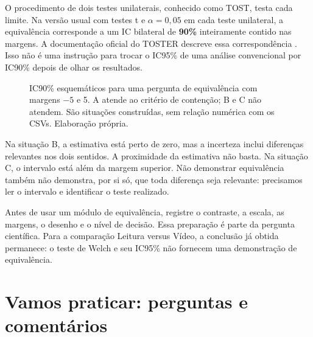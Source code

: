 O procedimento de dois testes unilaterais, conhecido como TOST, testa cada limite. Na versão usual com testes t e $\alpha=0{,}05$ em cada teste unilateral, a equivalência corresponde a um IC bilateral de \textbf{90\%} inteiramente contido nas margens. A documentação oficial do TOSTER descreve essa correspondência \parencite{TOSTERHipoteses}. Isso não é uma instrução para trocar o IC95\% de uma análise convencional por IC90\% depois de olhar os resultados.

\begin{figure}[H]
\centering
{}
\caption{IC90\% esquemáticos para uma pergunta de equivalência com margens $-5$ e 5. A atende ao critério de contenção; B e C não atendem. São situações construídas, sem relação numérica com os CSVs. Elaboração própria.}
\label{fig:equivalencia-margens}
\end{figure}

Na situação B, a estimativa está perto de zero, mas a incerteza inclui diferenças relevantes nos dois sentidos. A proximidade da estimativa não basta. Na situação C, o intervalo está além da margem superior. Não demonstrar equivalência também não demonstra, por si só, que toda diferença seja relevante: precisamos ler o intervalo e identificar o teste realizado.

Antes de usar um módulo de equivalência, registre o contraste, a escala, as margens, o desenho e o nível de decisão. Essa preparação é parte da pergunta científica. Para a comparação Leitura versus Vídeo, a conclusão já obtida permanece: o teste de Welch e seu IC95\% não fornecem uma demonstração de equivalência.

\section{Vamos praticar: perguntas e comentários}


